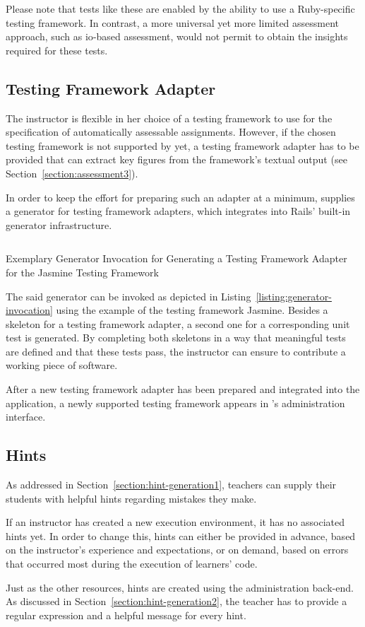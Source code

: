 Please note that tests like these are enabled by the ability to use a Ruby-specific testing framework. In contrast, a more universal yet more limited assessment approach, such as \gls{io}-based assessment, would not permit to obtain the insights required for these tests.

\subsection{Testing Framework Adapter}

The instructor is flexible in her choice of a testing framework to use for the specification of automatically assessable assignments. However, if the chosen testing framework is not supported by \tool yet, a testing framework adapter has to be provided that can extract key figures from the framework's textual output (see Section~\ref{section:assessment3}).

In order to keep the effort for preparing such an adapter at a minimum, \tool supplies a generator for testing framework adapters, which integrates into Rails' built-in generator infrastructure.

\begin{listing}
\inputminted[frame=lines]{sh}{listings/generator-invocation.sh}
\vspace{-0.33cm}
\caption{Exemplary Generator Invocation for Generating a Testing Framework Adapter for the Jasmine Testing Framework}
\label{listing:generator-invocation}
\end{listing}

The said generator can be invoked as depicted in Listing~\ref{listing:generator-invocation} using the example of the testing framework Jasmine. Besides a skeleton for a testing framework adapter, a second one for a corresponding unit test is generated. By completing both skeletons in a way that meaningful tests are defined and that these tests pass, the instructor can ensure to contribute a working piece of software.

After a new testing framework adapter has been prepared and integrated into the application, a newly supported testing framework appears in \tool's administration interface.

\subsection{Hints}

As addressed in Section~\ref{section:hint-generation1}, teachers can supply their students with helpful hints regarding mistakes they make.

If an instructor has created a new execution environment, it has no associated hints yet. In order to change this, hints can either be provided in advance, based on the instructor's experience and expectations, or on demand, based on errors that occurred most during the execution of learners' code.

Just as the other resources, hints are created using the administration back-end. As discussed in Section~\ref{section:hint-generation2}, the teacher has to provide a regular expression and a helpful message for every hint.
